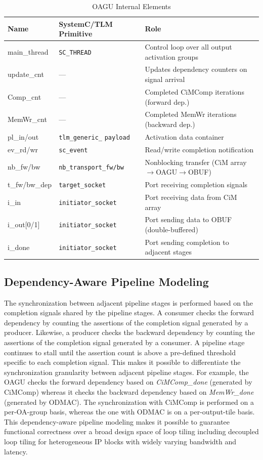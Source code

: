 \documentclass[lettersize,journal]{IEEEtran}
\begin{document}
\begin{table}[!t]
\centering
\caption{OAGU Internal Elements}
\label{tab:oagu_elements}
\renewcommand{\arraystretch}{1.05}
\scriptsize
\begin{tabular}{@{}llp{3.2cm}@{}}
\toprule
\textbf{Name} & \textbf{SystemC/TLM Primitive} & \textbf{Role} \\
\midrule
main\_thread & \texttt{SC\_THREAD} & Control loop over all output activation groups \\
update\_cnt & --- & Updates dependency counters on signal arrival \\
Comp\_cnt & --- & Completed CiMComp iterations (forward dep.) \\
MemWr\_cnt & --- & Completed MemWr iterations (backward dep.) \\
pl\_in/out & \texttt{tlm\_generic\_} \texttt{payload} & Activation data container \\
ev\_rd/wr & \texttt{sc\_event} & Read/write completion notification \\
nb\_fw/bw & \texttt{nb\_transport\_fw/bw} & Nonblocking transfer (CiM array$\rightarrow$OAGU$\rightarrow$OBUF) \\
t\_fw/bw\_dep & \texttt{target\_socket} & Port receiving completion signals \\
i\_in & \texttt{initiator\_socket} & Port receiving data from CiM array \\
i\_out[0/1] & \texttt{initiator\_socket} & Port sending data to OBUF (double-buffered) \\
i\_done & \texttt{initiator\_socket} & Port sending completion to adjacent stages \\
\bottomrule
\end{tabular}
\end{table}

\subsection{Dependency-Aware Pipeline Modeling}
\label{subsec:pipeline_simulation}

The synchronization between adjacent pipeline stages is performed based on the completion signals shared by the pipeline stages. A consumer checks the forward dependency by counting the assertions of the completion signal generated by a producer. Likewise, a producer checks the backward dependency by counting the assertions of the completion signal generated by a consumer. A pipeline stage continues to stall until the assertion count is above a pre-defined threshold specific to each completion signal. This makes it possible to differentiate the synchronization granularity between adjacent pipeline stages. For example, the OAGU checks the forward dependency based on \textit{CiMComp\_done} (generated by CiMComp) whereas it checks the backward dependency based on \textit{MemWr\_done} (generated by ODMAC). The synchronization with CiMComp is performed on a per-OA-group basis, whereas the one with ODMAC is on a per-output-tile basis. This dependency-aware pipeline modeling makes it possible to guarantee functional correctness over a broad design space of loop tiling including decoupled loop tiling for heterogeneous IP blocks with widely varying bandwidth and latency. 
\end{document}
